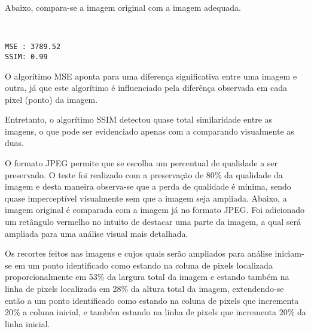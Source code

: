 \documentclass{IEEEtran}
\begin{document}
Abaixo, compara-se a imagem original com a imagem adequada.


    \begin{center}
    \end{center}
    { \hspace*{\fill} \\}
    
    \begin{Verbatim}[commandchars=\\\{\}]
MSE : 3789.52
SSIM: 0.99

    \end{Verbatim}

    O algorítimo MSE aponta para uma diferença significativa entre uma
imagem e outra, já que este algorítimo é influenciado pela diferênça
observada em cada pixel (ponto) da imagem.

Entretanto, o algorítimo SSIM detectou quase total similaridade entre as
imagens, o que pode ser evidenciado apenas com a comparando visualmente
as duas.

O formato JPEG permite que se escolha um percentual de qualidade a ser
preservado. O teste foi realizado com a preservação de 80\% da qualidade
da imagem e desta maneira observa-se que a perda de qualidade é mínima,
sendo quase imperceptível visualmente sem que a imagem seja ampliada.
Abaixo, a imagem original é comparada com a imagem já no formato JPEG.
Foi adicionado um retângulo vermelho no intuito de destacar uma parte da
imagem, a qual será ampliada para uma análise visual mais detalhada.

Os recortes feitos nas imagens e cujos quais serão ampliados para
análise iniciam-se em um ponto identificado como estando na coluna de
pixels localizada proporcionalmente em 53\% da largura total da imagem e
estando também na linha de pixels localizada em 28\% da altura total da
imagem, extendendo-se então a um ponto identificado como estando na
coluna de pixels que incrementa 20\% a coluna inicial, e também estando
na linha de pixels que incrementa 20\% da linha inicial.


    \begin{center}
    \end{center}
    { \hspace*{\fill} \\}
    
\end{document}
